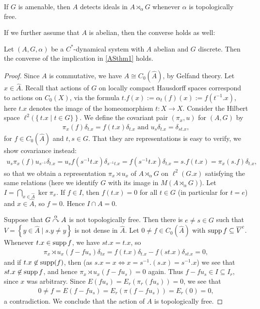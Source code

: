 \begin{corollary}
	If $G$ is amenable, then $A$ detects ideals in $A \rtimes_\alpha G$ whenever $\alpha$ is topologically free.
\end{corollary}

If we further assume that $A$ is abelian, then the converse holds as well:
\begin{theorem}
	Let $(A,G,\alpha)$ be a $C^*$-dynamical system with $A$ abelian and $G$ discrete. Then the converse of the implication in \cref{ASthm1} holds.
	\label{ASthm2}
\end{theorem}
\begin{proof}
	Since $A$ is commutative, we have $A \cong C_0(\hat A)$, by Gelfand theory. Let $x \in \hat A$. Recall that  actions of $G$ on locally compact Hausdorff spaces correspond to actions on $C_0(X)$, via the formula $t.f(x) :=  \alpha_t(f)(x) := f(t^{-1}.x)$, here $t.x$ denotes the image of the homeomorphism $t \colon X \to X$. Consider the Hilbert space $\ell^2(\left\{ t.x \mid t \in G\} \right\}$. We define the covariant pair $(\pi_x,u)$ for $(A,G)$ by
	\begin{align*}
		\pi_x(f) \delta_{t.x} = f(t.x) \delta_{t.x} \text{ and } u_s \delta_{t.x} = \delta_{st.x},
	\end{align*}
	for $f \in C_0(\hat A)$ and $t,s \in G$. That they are representations is easy to verify, we show covariance instead:
	\begin{align*}
		u_s \pi_x(f) u_{s^{-1}} \delta_{t.x} = u_{s} f(s^{-1}t.x)\delta_{s^{-1}t.x} = f(s^{-1}t.x) \delta_{t.x} = s.f(t.x) = \pi_x(s.f)\delta_{t.x},
	\end{align*}
	so that we obtain a representation $\pi_x \rtimes u_x$ of $A \rtimes_\alpha G$ on $\ell^2(G.x)$ satisfying the same relations (here we identify $G$ with its image in $M(A \rtimes_\alpha G)$). Let $I = \bigcap_{x \in \hat A} \ker \pi_{x}$. If $f \in I$, then $f(t.x) = 0$ for all $t \in G$ (in particular for $t=e$) and $x \in \hat A$, so $f = 0$. Hence $I \cap A = 0$.
	
	Suppose that $G \stackrel{\alpha}{\curvearrowright} A$ is not topologically free. Then there is $e \neq s \in G$ such that $V=\left\{ y \in \hat A \mid s.y \neq y \right\}$ is not dense in $\hat A$. Let $0 \neq f \in C_0(\hat A)$ with $\operatorname{supp} f \subseteq \overline{V}^c$. Whenever $t.x \in \operatorname{supp} f$, we have $st.x = t.x$, so
	\begin{align*}
		\pi_x\rtimes u_x(f-fu_s)\delta_{tx} = f(t.x) \delta_{t.x} - f(st.x)\delta_{st.x}= 0,
	\end{align*}
	and if $t.x \not \in \operatorname{supp}(f)$, then (as $s.x=x \iff x = s^{-1}.(s.x)=s^{-1}.x$) we see that $st.x \not \in \operatorname{supp} f$, and hence $\pi_{x} \rtimes u_x (f-f u_s) = 0$ again. Thus $f-f u_s \in I \subseteq I_r$, since $x$ was arbitrary. Since $E(f u_s) = E_r(\pi_r(fu_s)
) =0$, we see that 
	\begin{align*}
		0 \neq f = E(f-fu_s) = E_r (\pi(f-fu_s))= E_r(0) =0,
	\end{align*}
	a contradiction. We conclude that the action of $A$ is topologically free.
\end{proof}

